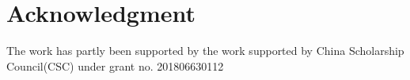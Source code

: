 \section*{Acknowledgment}
The work has partly been supported by the work supported by China Scholarship
Council(CSC) under grant no. 201806630112

